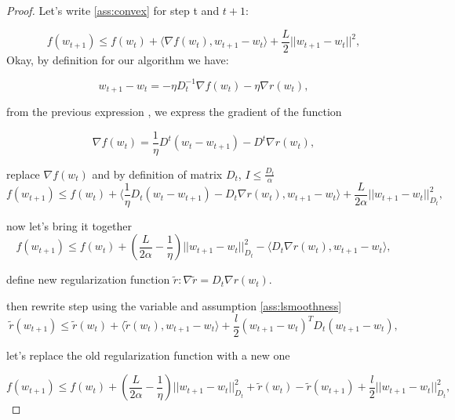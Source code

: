 \documentclass{article}
\begin{document}
\begin{proof}
Let's write \ref{ass:convex} for step t and $t+1$:

\begin{equation*}
    f(w_{t+1}) \leq f(w_t) + \langle \nabla f(w_t), w_{t+1} - w_t \rangle + \frac{L}{2}||w_{t+1} - w_t ||^2,
\end{equation*}
Okay, by definition for our algorithm we have:

\begin{equation*}
w_{t+1} - w_t = -\eta D_t^{-1} \nabla f(w_t) - \eta \nabla r(w_t),
\end{equation*}

from the previous expression , we express the gradient of the function

\begin{equation*}
\nabla f(w_t) = \frac{1}{\eta} D^t(w_t - w_{t+1}) - D^t \nabla r(w_t),
\end{equation*}

replace $\nabla f(w_t)$ and by definition of matrix $D_t$, $I \leq \frac{D_t}{\alpha}$
\begin{equation*}
    f(w_{t+1}) \leq f(w_t) + \langle \frac{1}{\eta}D_t(w_t - w_{t+1}) - D_t\nabla r(w_t), w_{t+1} - w_t \rangle + \frac{L}{2 \alpha} ||w_{t+1} - w_t||_{D_t}^2,
\end{equation*}

now let's bring it together
\begin{equation*}
    f(w_{t+1}) \leq f(w_t) + \left(\frac{L}{2 \alpha} - \frac{1}{\eta} \right) ||w_{t+1} - w_t||_{D_t}^2 - \langle D_t \nabla r(w_t), w_{t+1} - w_t \rangle,
\end{equation*}

define new regularization function $\tilde{r} : \nabla \tilde{r} = D_t \nabla r(w_t)$. 

then rewrite step using the variable and assumption \ref{ass:lsmoothness}
\begin{equation*}
    \tilde{r}(w_{t+1}) \leq \tilde{r}(w_t) + \langle \tilde{r}(w_t), w_{t+1} - w_t \rangle + \frac{l}{2} (w_{t+1} - w_t)^T D_t (w_{t+1} - w_t),
\end{equation*}

let's replace the old regularization function with a new one

\begin{equation*}
    f(w_{t+1}) \leq f(w_t) + \left( \frac{L}{2\alpha} - \frac{1}{\eta} \right) ||w_{t+1} - w_t||_{D_t}^2 + \tilde{r}(w_t) - \tilde{r}(w_{t+1}) + \frac{l}{2}||w_{t+1}-w_t||_{D_t}^2,
\end{equation*}


\end{proof}
\end{document}
